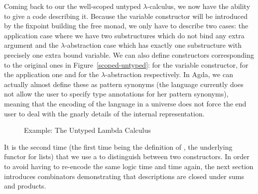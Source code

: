 Coming back to our the well-scoped untyped $\lambda$-calculus,
we now have the ability to give a code describing it. Because
the variable constructor will be introduced by the fixpoint
building the free monad, we only have to describe two cases:
the application case where we have two substructures which do
not bind any extra argument and the $\lambda$-abstraction case
which has exactly one substructure with precisely one extra
bound variable. We can also define constructors corresponding
to the original ones in Figure~\ref{scoped-untyped}: 
for  the variable constructor,  for  the
application one and  for  the $\lambda$-abstraction
respectively. In Agda, we can actually almost define these as
pattern synonyms (the language currently does not allow the user
to specify type annotations for her pattern synonyms), meaning
that the encoding of the language in a universe does not force
the end user to deal with the gnarly details of the internal
representation.

\begin{figure}[h]
\begin{minipage}{0.55\textwidth}
\end{minipage}
\begin{minipage}{0.35\textwidth}
\end{minipage}

\begin{minipage}{0.30\textwidth}
\end{minipage}
\begin{minipage}{0.30\textwidth}
\end{minipage}\hspace{2em}
\begin{minipage}{0.30\textwidth}
\end{minipage}
\caption{Example: The Untyped Lambda Calculus}
\end{figure}

It is the second time (the first time being the definition of
, the underlying functor for lists) that we use a
 to distinguish between two constructors. In order
to avoid having to re-encode the same logic time and time again,
the next section introduces combinators demonstrating that
descriptions are closed under sums and products.

